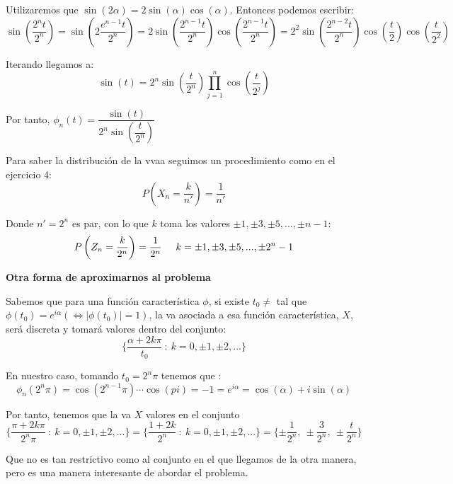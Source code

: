\documentclass[openany]{book}
\begin{document}
\begin{exercise}
    $  $\\ 
    Utilizaremos que $ \sin(2 \alpha ) = 2 \sin(\alpha )\cos(\alpha) $. Entonces podemos escribir:
    $$ \sin\left(\dfrac{2^{n}t}{2^{n}}\right) = \sin\left(2 \dfrac{e^{n-1}t}{2^{n}}\right) = 2 \sin\left(\dfrac{2^{n-1}t}{2^{n}}\right) \cos\left(\dfrac{2^{n-1}t}{2^{n}}\right) = 2^2 \sin\left(\dfrac{2^{n-2}t}{2^{n}}\right) \cos\left(\dfrac{t}{2}\right) \cos\left(\dfrac{t}{2^2}\right) $$

    Iterando llegamos a:
    $$ \sin(t) = 2^{n}\sin\left(\dfrac{t}{2^{n}}\right) \prod_{j=1}^{n} \cos\left(\dfrac{t}{2^{j}}\right) $$
    
    Por tanto, $ \phi_n(t) = \dfrac{\sin(t)}{2^{n}\sin\left(\dfrac{t}{2^{n}}\right)} $

    Para saber la distribución de la vvaa seguimos un procedimiento como en el ejercicio 4:
    $$ P \left(X_n = \dfrac{k}{n'}\right) = \dfrac{1}{n'} $$

    Donde $ n' = 2^{n} $ es par, con lo que $ k $ toma los valores $ \pm 1, \pm 3,\pm 5,...,\pm n-1 $:
    $$ P\left(Z_n = \dfrac{k}{2^{n}}\right) = \dfrac{1}{2^{n}}\hspace{5mm} k = \pm 1, \pm 3,\pm 5, ...,\pm 2^{n}-1$$
    
    \begin{flushright}
        \textbf{Otra forma de aproximarnos al problema}
    \end{flushright}

    Sabemos que para una función característica $ \phi $, si existe $ t_0 \ne  $ tal que $ \phi(t_0) = e^{i \alpha} ( \iff |\phi(t_0)| = 1) $, la va asociada a esa función característica, $ X $, será discreta y tomará valores dentro del conjunto:
    $$ \{ \dfrac{\alpha +2k \pi}{t_0}\ :\ k = 0,\pm 1,\pm 2,...\} $$

    En nuestro caso, tomando $ t_0 = 2^{n}\pi $ tenemos que :
    $$ \phi_n(2^{n}\pi) = \cos(2^{n-1}\pi) \cdots \cos(pi) = -1 = e^{i \alpha } = \cos(\alpha)+i \sin(\alpha) $$
    
    Por tanto, tenemos que la va $ X $ valores en el conjunto
    $$ \{ \dfrac{\pi+2k \pi}{2^{n}\pi}\ :\ k = 0,\pm 1,\pm 2,...\} = \{ \dfrac{1+2k}{2^{n}}\ :\ k = 0,\pm 1,\pm 2,...\} = \{\pm \dfrac{1}{2^{n}},\ \pm \dfrac{3}{2^{n}},\ \pm \dfrac{t}{2^{n}}\} $$

    Que no es tan restrictivo como al conjunto en el que llegamos de la otra manera, pero es una manera interesante de abordar el problema.
\end{exercise}
\end{document}
